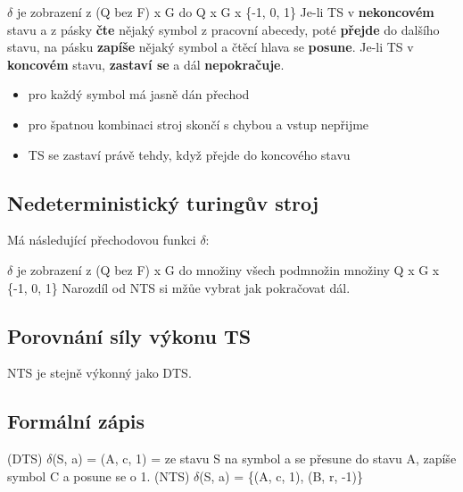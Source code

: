 \documentclass{../../szzclass}
\begin{document}
$\delta$ je zobrazení z (Q bez F) x G do Q x G x \{-1, 0, 1\}
\newline
Je-li TS v \textbf{nekoncovém} stavu a z pásky \textbf{čte} nějaký symbol z pracovní abecedy, poté \textbf{přejde} do dalšího stavu, na pásku \textbf{zapíše} nějaký symbol
a čtěcí hlava se \textbf{posune}.
\newline
Je-li TS v \textbf{koncovém} stavu, \textbf{zastaví se} a dál \textbf{nepokračuje}.
\newline
\begin{itemize}
	\item pro každý symbol má jasně dán přechod
	\item pro špatnou kombinaci stroj skončí s chybou a vstup nepřijme
	\item TS se zastaví právě tehdy, když přejde do koncového stavu
\end{itemize}

\subsection{Nedeterministický turingův stroj}
Má následující přechodovou funkci $\delta$:

$\delta$ je zobrazení z (Q bez F) x G do množiny všech podmnožin množiny Q x G x \{-1, 0, 1\}
\newline
\newline
Narozdíl od NTS si mžůe vybrat jak pokračovat dál.

\subsection{Porovnání síly výkonu TS}
NTS je stejně výkonný jako DTS.
\subsection{Formální zápis}
(DTS) $\delta$(S, a) = (A, c, 1) = ze stavu S na symbol a se přesune do stavu A, zapíše symbol C a posune se o 1.
\newline
(NTS) $\delta$(S, a) = \{(A, c, 1), (B, r, -1)\}
\end{document}
